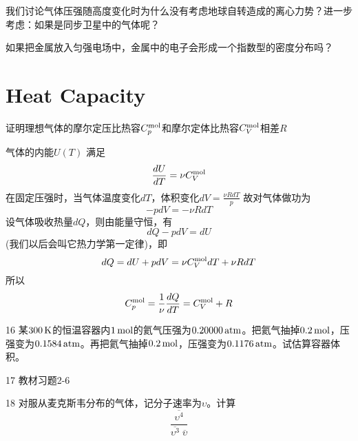 \documentclass[CJK]{beamer}
\begin{document}
\begin{frame}
\bch
{}

我们讨论气体压强随高度变化时为什么没有考虑地球自转造成的离心力势？进一步考虑：如果是同步卫星中的气体呢？

\ech
\end{frame}


\begin{frame}
\bch
{}
如果把金属放入匀强电场中，金属中的电子会形成一个指数型的密度分布吗？
\ech
\end{frame}


\section{Heat Capacity}


\begin{frame}
\bch
{\blue 证明理想气体的摩尔定压比热容$C_p^{\rm mol}$和摩尔定体比热容$C_V^{\rm mol}$相差$R$}

\skipline
{\scriptsize
气体的内能$U(T)$ 满足
$$\frac{dU}{dT} = \nu C_V^{\rm mol}$$
在固定压强时，当气体温度变化$dT$，体积变化$dV = \frac{ \nu R dT}{p}$
故对气体做功为
$$-p dV = - \nu R dT$$
设气体吸收热量$dQ$，则由能量守恒，有
$$dQ - pdV = dU$$
(我们以后会叫它热力学第一定律)，即
$$dQ = dU + pdV =  \nu C_V^{\rm mol}dT + \nu RdT$$
所以
$$C_p^{\rm mol} = \frac{1}{\nu} \frac{dQ}{dT} = C_V^{\rm mol} + R$$

}
\ech
\end{frame}

\begin{frame}
\bch
{\small
\bitem
\item[16]{某$300\,\mathrm{K}$的恒温容器内$1\,\mathrm{mol}$的氦气压强为$0.20000\,\mathrm{atm}$。把氦气抽掉$0.2\,\mathrm{mol}$，压强变为$0.1584\,\mathrm{atm}$。再把氦气抽掉$0.2\,\mathrm{mol}$，压强变为$0.1176\,\mathrm{atm}$。试估算容器体积。}
\item[17]{教材习题2-6}
\item[18]{对服从麦克斯韦分布的气体，记分子速率为$\upsilon$。计算$$\frac{\overline{\upsilon^4}}{\overline{\upsilon^3}\;\overline{\upsilon}}$$}
\eitem
}
\ech
\end{frame}
\end{document}
